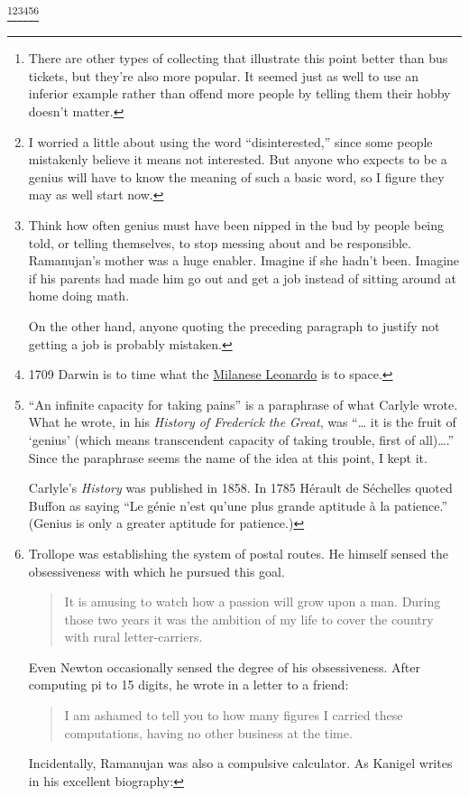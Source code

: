 \documentclass[12pt]{book}
\begin{document}
\footnote{There are other types of collecting that illustrate this point
better than bus tickets, but they're also more popular. It seemed just
as well to use an inferior example rather than offend more people by
telling them their hobby doesn't matter.}\footnote{I worried a little about using the word ``disinterested,'' since
some people mistakenly believe it means not interested. But anyone who
expects to be a genius will have to know the meaning of such a basic
word, so I figure they may as well start now.}\footnote{Think how often genius must have been nipped in the bud by
people being told, or telling themselves, to stop messing about and be
responsible. Ramanujan's mother was a huge enabler. Imagine if she
hadn't been. Imagine if his parents had made him go out and get a job
instead of sitting around at home doing math.

On the other hand, anyone quoting the preceding paragraph to justify not
getting a job is probably mistaken.}\footnote{1709 Darwin is to time what the \href{cities.html}{Milanese
Leonardo} is to space.}\footnote{``An infinite capacity for taking pains'' is a paraphrase of
what Carlyle wrote. What he wrote, in his \emph{History of Frederick the
Great}, was ``\ldots{} it is the fruit of `genius' (which means
transcendent capacity of taking trouble, first of all)\ldots.'' Since
the paraphrase seems the name of the idea at this point, I kept it.

Carlyle's \emph{History} was published in 1858. In 1785 Hérault de
Séchelles quoted Buffon as saying ``Le génie n'est qu'une plus grande
aptitude à la patience.'' (Genius is only a greater aptitude for
patience.)}\footnote{Trollope was establishing the system of postal routes. He
himself sensed the obsessiveness with which he pursued this goal.

\begin{quote}
It is amusing to watch how a passion will grow upon a man. During those
two years it was the ambition of my life to cover the country with rural
letter-carriers.
\end{quote}

Even Newton occasionally sensed the degree of his obsessiveness. After
computing pi to 15 digits, he wrote in a letter to a friend:

\begin{quote}
I am ashamed to tell you to how many figures I carried these
computations, having no other business at the time.
\end{quote}

Incidentally, Ramanujan was also a compulsive calculator. As Kanigel
writes in his excellent biography:

}
\end{document}

